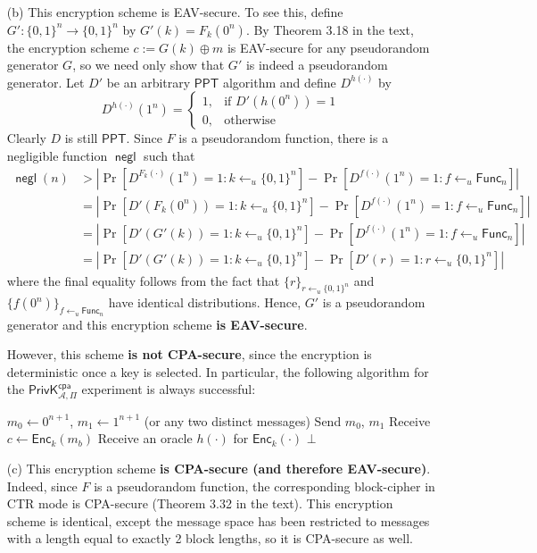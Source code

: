 \documentclass[12pt]{article}
\numberwithin{equation}{section}
\theoremstyle{plain}
\newcommand{\set}[1]{\{ #1 \}}
\DeclareMathOperator*{\prob}{Pr}
\newcommand{\ppt}{\algo{PPT}}
\newcommand{\func}{\algo{Func}}
\newcommand{\algo}[1]{\mathsf{#1}}
\newcommand{\adv}{\mathcal{A}}
\DeclareMathOperator{\negl}{\algo{negl}}
\newcommand{\enc}{\algo{Enc}}
\newcommand{\expir}[3]{\algo{PrivK}^{#1}_{{#2},{#3}}}
\newcommand{\cpa}{\algo{cpa}}
\begin{document}
\begin{enumerate}
\item[(b)] This encryption scheme is EAV-secure.
To see this, define $G': \set{ 0, 1 }^n \to \set{ 0, 1 }^n$ by $G'(k) = F_k(0^n)$.
By Theorem 3.18 in the text, the encryption scheme $c := G(k) \oplus m$ is EAV-secure for any pseudorandom generator $G$,
so we need only show that $G'$ is indeed a pseudorandom generator.
Let $D'$ be an arbitrary $\ppt$ algorithm and define $D^{h(\cdot)}$ by
\begin{equation*}
    D^{h(\cdot)}(1^n) =
    \begin{cases}
        1, &\text{if }D'(h(0^n)) = 1\\
        0, &\text{otherwise}
    \end{cases}
\end{equation*}
Clearly $D$ is still $\ppt$.
Since $F$ is a pseudorandom function,
there is a negligible function $\negl$ such that
\begin{align*}
    \negl(n) 
        &> |\prob[D^{F_k(\cdot)}(1^n) = 1 : k \gets_u \set{ 0, 1 }^n] - \prob[D^{f(\cdot)}(1^n) = 1 : f \gets_u \func_n]|\\
        &= |\prob[D'(F_k(0^n)) = 1 : k \gets_u \set{ 0, 1 }^n] - \prob[D^{f(\cdot)}(1^n) = 1 : f \gets_u \func_n]|\\
        &= |\prob[D'(G'(k)) = 1 : k \gets_u \set{ 0, 1 }^n] - \prob[D^{f(\cdot)}(1^n) = 1 : f \gets_u \func_n]|\\
        &= |\prob[D'(G'(k)) = 1 : k \gets_u \set{ 0, 1 }^n] - \prob[D'(r) = 1 : r \gets_u \set{ 0, 1 }^n]|
\end{align*}
where the final equality follows from the fact that
$\{r\}_{r \gets_u \set{0,1}^n}$ and $\{f(0^n)\}_{f \gets_u \func_n}$
have identical distributions.
Hence, $G'$ is a pseudorandom generator and this encryption scheme \textbf{is EAV-secure}.

However, this scheme \textbf{is not CPA-secure}, since the encryption is deterministic once a key is selected.
In particular, the following algorithm for the $\expir{\cpa}{\adv}{\Pi}$ experiment is always successful:
\begin{algorithm}[H]
\begin{algorithmic}
    \State $m_0 \gets 0^{n+1}$, $m_1 \gets 1^{n+1}$ (or any two distinct messages)
    \State Send $m_0$, $m_1$
    \State Receive $c \gets \enc_k(m_b)$
    \State Receive an oracle $h(\cdot)$ for $\enc_k(\cdot)$
        \State {}
        \State {}
    \Else
        \State \Return $\bot$
    \EndIf
\EndProcedure
\end{algorithmic}
\end{algorithm}

\item[(c)] This encryption scheme \textbf{is CPA-secure (and therefore EAV-secure)}.
Indeed, since $F$ is a pseudorandom function,
the corresponding block-cipher in CTR mode is CPA-secure (Theorem 3.32 in the text).
This encryption scheme is identical, except the message space has been restricted to messages with a length equal to exactly 2 block lengths,
so it is CPA-secure as well.

\end{enumerate}
\end{document}

